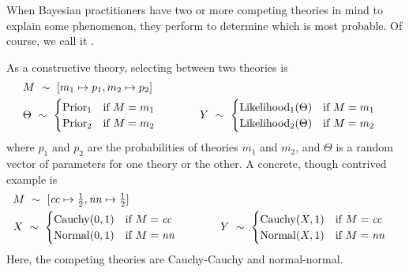 When Bayesian practitioners have two or more competing theories in mind to explain some phenomenon, they perform  to determine which is most probable.
Of course, we call it .

As a constructive theory, selecting between two theories is
\begin{equation}
\begin{aligned}
	&M \ \sim\ [m_1 \mapsto p_1, m_2 \mapsto p_2] \\
	&\begin{aligned}
	&\Theta \ \sim\ 
		\begin{cases}
			\mathrm{Prior_1} & \text{if } M = m_1 \\
			\mathrm{Prior_2} & \text{if } M = m_2
		\end{cases}
	\end{aligned}
	&\tab\tab
	\begin{aligned}
	&Y \ \sim\ 
		\begin{cases}
			\mathrm{Likelihood_1}(\Theta) & \text{if } M = m_1 \\
			\mathrm{Likelihood_2}(\Theta) & \text{if } M = m_2
		\end{cases}
	\end{aligned}
\end{aligned}
\end{equation}
where $p_1$ and $p_2$ are the probabilities of theories $m_1$ and $m_2$, and $\Theta$ is a random vector of parameters for one theory or the other.
A concrete, though contrived example is
\begin{equation}
\begin{aligned}
	&M \ \sim\ [\mathit{cc} \mapsto \tfrac{1}{2}, \mathit{nn} \mapsto \tfrac{1}{2}] \\
	&\begin{aligned}
	&X \ \sim\ 
		\begin{cases}
			\mathrm{Cauchy}(0,1) & \text{if } M = \mathit{cc} \\
			\mathrm{Normal}(0,1) & \text{if } M = \mathit{nn}
		\end{cases}
	\end{aligned}
	&\tab\tab
	\begin{aligned}
	&Y \ \sim\ 
		\begin{cases}
			\mathrm{Cauchy}(X,1) & \text{if } M = \mathit{cc} \\
			\mathrm{Normal}(X,1) & \text{if } M = \mathit{nn}
		\end{cases}
	\end{aligned}
\end{aligned}
\end{equation}
Here, the competing theories are Cauchy-Cauchy and normal-normal.

